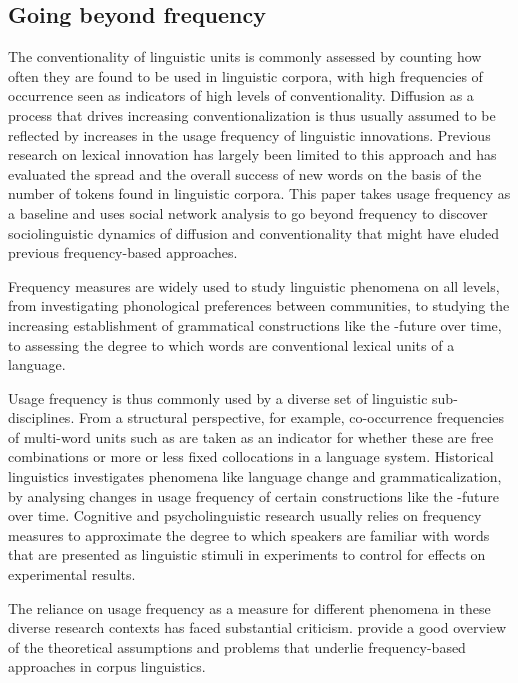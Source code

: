 \documentclass[
  a4paper,
  abstract=on,
  captions=tableabove
  ]{scrartcl}
\begin{document}
  \subsection{Going beyond frequency}
    \label{subsec:beyond-freq}

    The conventionality of linguistic units is commonly assessed by counting how often they are found to be used in linguistic corpora, with high frequencies of occurrence seen as indicators of high levels of conventionality. Diffusion as a process that drives increasing conventionalization is thus usually assumed to be reflected by increases in the usage frequency of linguistic innovations. Previous research on lexical innovation has largely been limited to this approach and has evaluated the spread and the overall success of new words on the basis of the number of tokens found in linguistic corpora. This paper takes usage frequency as a baseline and uses social network analysis to go beyond frequency to discover sociolinguistic dynamics of diffusion and conventionality that might have eluded previous frequency-based approaches.

    Frequency measures are widely used to study linguistic phenomena on all levels, from investigating phonological preferences between communities, to studying the increasing establishment of grammatical constructions like the -future over time, to assessing the degree to which words are conventional lexical units of a language.

    Usage frequency is thus commonly used by a diverse set of linguistic sub-disciplines. From a structural perspective, for example, co-occurrence frequencies of multi-word units such as  are taken as an indicator for whether these are free combinations or more or less fixed collocations in a language system. Historical linguistics investigates phenomena like language change and grammaticalization, by analysing changes in usage frequency of certain constructions like the -future over time. Cognitive and psycholinguistic research usually relies on frequency measures to approximate the degree to which speakers are familiar with words that are presented as linguistic stimuli in experiments to control for effects on experimental results. 

    The reliance on usage frequency as a measure for different phenomena in these diverse research contexts has faced substantial criticism. \cite{Stefanowitsch2017CorpusbasedPerspective} provide a good overview of the theoretical assumptions and problems that underlie frequency-based approaches in corpus linguistics.
\end{document}
